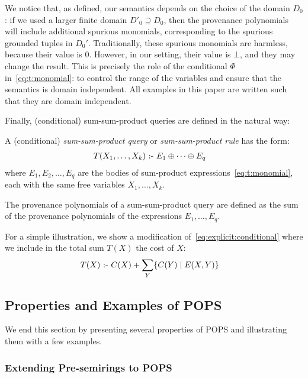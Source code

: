 We notice that, as defined, our semantics depends on the choice of the
domain $D_0$: if we used a larger finite domain $D'_0 \supseteq D_0$,
then the provenance polynomials will include additional spurious
monomials, corresponding to the spurious grounded tuples in $D_0'$.
Traditionally, these spurious monomials are harmless, because their
value is 0.  However, in our setting, their value is $\bot$, and they
may change the result.  This is precisely the role of the conditional
$\Phi$ in~\eqref{eq:t:monomial}: to control the range of the variables
and ensure that the semantics is domain independent.  All examples in
this paper are written such that they are domain independent.

Finally, (conditional) sum-sum-product queries are defined in the natural way:

\begin{defn} \label{def:sum:sum:product}
    A (conditional) {\em sum-sum-product query} or {\em sum-sum-product rule} has the
  form:
%
\begin{align}
  T(X_1, \ldots, X_k) &\text{ :- } E_1 \oplus \cdots \oplus E_q \label{eq:sum:sum:product}
  \end{align}
%
  where $E_1, E_2, \ldots, E_q$ are the bodies of sum-product
  expressions~\eqref{eq:t:monomial}, each with the same free variables
  $X_1, \ldots, X_k$.
\end{defn}

The provenance polynomials of a sum-sum-product query are defined as
the sum of the provenance polynomials of the expressions
$E_1, \ldots, E_q$.

For a simple illustration, we show a modification
of~\eqref{eq:explicit:conditional} where we include in the total sum
$T(X)$ the cost of $X$:
%
\begin{align*}
    T(X) \text{ :- } & C(X) + \sum_Y \{{C(Y)}\mid{E(X,Y)}\}
\end{align*}

\subsection{Properties and Examples of POPS}
\label{subsec:examples:pops}

We end this section by presenting several properties of POPS and
illustrating them  with a few examples.

\subsubsection{Extending Pre-semirings to POPS}

